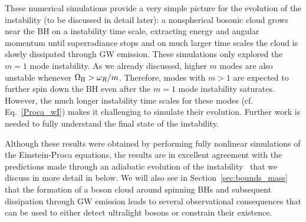 \documentclass[11pt]{article}
\numberwithin{equation}{section} %
\begin{document}
These numerical simulations provide a very simple picture for the evolution of the instability (to be 
discussed in detail later): a nonspherical bosonic cloud grows near the BH on a instability 
time scale, extracting energy and angular momentum until superradiance stops and on much larger time scales the cloud is 
slowly dissipated through GW emission. These simulations only explored the $m=1$ mode instability. As we already 
discussed, higher $m$ modes are also unstable whenever $\Omega_{\rm H}>\omega_R/m$. Therefore, modes with $m>1$ are 
expected to further spin down the BH even after the $m=1$ mode instability saturates. However, the much longer 
instability time scales for these modes (cf. Eq.~\eqref{Proca_wI}) makes it challenging to simulate their evolution. 
Further work is needed to fully understand the final state of the instability.

Although these results were obtained by performing fully nonlinear simulations of the Einstein-Proca equations, the results are in excellent agreement with the predictions made through an adiabatic evolution of the instability~\cite{Brito:2014wla} that we discuss in more detail in below. We will also see in Section~\ref{sec:bounds_mass} that the formation of a boson cloud around spinning BHs and subsequent dissipation through GW emission leads to several observational consequences that can be used to either detect ultralight bosons or constrain their existence.

\end{document}
